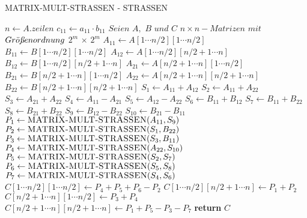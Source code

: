 \begin{algorithm}[hbt!]
\begin{algorithmic}[1]
\caption{MATRIX-MULT-STRASSEN - STRASSEN}
    \State $n\gets A.zeilen$
        \State $c_{11}\gets a_{11}\cdot b_{11}$
    \Else  
        \State $Seien$ $A,$ $B$ $und$ $C$ $n\times n-Matrizen$ $mit$ $Gr\Ddot{o}{\textit{\text{\ss}}}enordnung$ $2^m$ $\times$ $2^m$
        \State $A_{11}\gets A[1\dotsb n/2][1\dotsb n/2]$
        \State $B_{11}\gets B[1\dotsb n/2][1\dotsb n/2]$
        \State $A_{12}\gets A[1\dotsb n/2][n/2 + 1\dotsb n]$
        \State $B_{12}\gets B[1\dotsb n/2][n/2 + 1\dotsb n]$
        \State $A_{21}\gets A[n/2 + 1\dotsb n][1\dotsb n/2]$
        \State $B_{21}\gets B[n/2 + 1\dotsb n][1\dotsb n/2]$
        \State $A_{22}\gets A[n/2 + 1\dotsb n][n/2 + 1\dotsb n]$
        \State $B_{22}\gets B[n/2 + 1\dotsb n][n/2 + 1\dotsb n]$
        \State $S_{1}\gets A_{11} + A_{12}$
        \State $S_{2}\gets A_{11} + A_{22}$
        \State $S_{3}\gets A_{21} + A_{22}$
        \State $S_{4}\gets A_{11} - A_{21}$
        \State $S_{5}\gets A_{12} - A_{22}$
        \State $S_{6}\gets B_{11} + B_{12}$
        \State $S_{7}\gets B_{11} + B_{22}$
        \State $S_{8}\gets B_{21} + B_{22}$
        \State $S_{9}\gets B_{12} - B_{22}$
        \State $S_{10}\gets B_{21} - B_{11}$
        \State $P_1\gets \Call{MATRIX-MULT-STRASSEN}{A_{11}, S_{9}}$
        \State $P_2\gets \Call{MATRIX-MULT-STRASSEN}{S_{1}, B_{22}}$
        \State $P_3\gets \Call{MATRIX-MULT-STRASSEN}{S_{3}, B_{11}}$
        \State $P_4\gets \Call{MATRIX-MULT-STRASSEN}{A_{22}, S_{10}}$
        \State $P_5\gets \Call{MATRIX-MULT-STRASSEN}{S_{2}, S_{7}}$
        \State $P_6\gets \Call{MATRIX-MULT-STRASSEN}{S_{5}, S_{8}}$
        \State $P_7\gets \Call{MATRIX-MULT-STRASSEN}{S_{4}, S_{6}}$
        \State $C[1\dotsb n/2][1\dotsb n/2]\gets P_{4} + P_{5} + P_{6} - P_{2}$
        \State $C[1\dotsb n/2][n/2 + 1\dotsb n]\gets P_{1} + P_{2}$
        \State $C[n/2 + 1\dotsb n][1\dotsb n/2]\gets P_{3} + P_{4}$
        \State $C[n/2 + 1\dotsb n][n/2 + 1\dotsb n]\gets P_{1} + P_{5} - P_{3} - P_{7}$
    \EndIf
    \State \textbf{return} $C$ 
\EndProcedure
\end{algorithmic}\label{alg:algorithm3}
\end{algorithm}